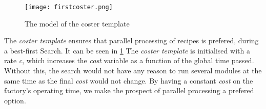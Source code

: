 \begin{figure}[h]
\centering
\texttt{[image: firstcoster.png]}
\caption{The model of the coster template}
\label{fig:firstcoster}
\end{figure}

The \emph{coster template} ensures that parallel processing of recipes is prefered, during a best-first Search. It can be seen in \cref{fig:firstcoster} The \emph{coster template} is initialised with a rate \emph{c}, which increases the \emph{cost} variable as a function of the global time passed. Without this, the search would not have any reason to run several modules at the same time as the final \emph{cost} would not change. By having a constant \emph{cost} on the factory’s operating time, we make the prospect of parallel processing a prefered option.







